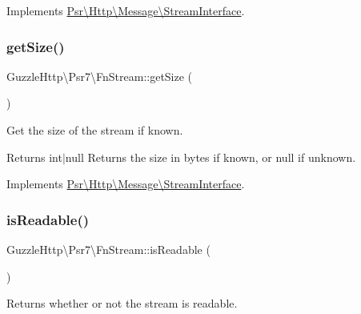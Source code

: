 Implements \hyperlink{interfacePsr_1_1Http_1_1Message_1_1StreamInterface_ac5e77fbbc7ba4235a4041d966f3aaa84}{Psr\textbackslash{}\+Http\textbackslash{}\+Message\textbackslash{}\+Stream\+Interface}.

\mbox{\label{classGuzzleHttp_1_1Psr7_1_1FnStream_a736dbff0dbf809c32e29c9e7805ccdeb}} 
\subsubsection{\texorpdfstring{get\+Size()}{getSize()}}
{\footnotesize\ttfamily Guzzle\+Http\textbackslash{}\+Psr7\textbackslash{}\+Fn\+Stream\+::get\+Size (\begin{DoxyParamCaption}{ }\end{DoxyParamCaption})}

Get the size of the stream if known.

\begin{DoxyReturn}{Returns}
int$\vert$null Returns the size in bytes if known, or null if unknown. 
\end{DoxyReturn}


Implements \hyperlink{interfacePsr_1_1Http_1_1Message_1_1StreamInterface_a85b9ff28e3ee39d95a47e623d866cf76}{Psr\textbackslash{}\+Http\textbackslash{}\+Message\textbackslash{}\+Stream\+Interface}.

\mbox{\label{classGuzzleHttp_1_1Psr7_1_1FnStream_a2f45ad8af60ff908f1aac72e0887452f}} 
\subsubsection{\texorpdfstring{is\+Readable()}{isReadable()}}
{\footnotesize\ttfamily Guzzle\+Http\textbackslash{}\+Psr7\textbackslash{}\+Fn\+Stream\+::is\+Readable (\begin{DoxyParamCaption}{ }\end{DoxyParamCaption})}

Returns whether or not the stream is readable.

